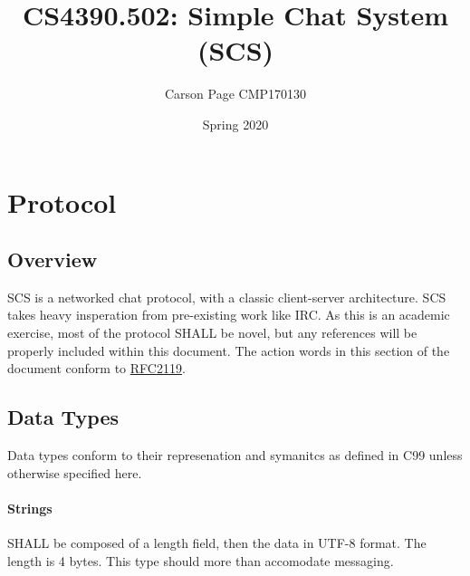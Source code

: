 \documentclass[12pt]{article}
\title{CS4390.502: Simple Chat System (SCS)}
\author{Carson Page CMP170130}
\date{Spring 2020}
\begin{document}
\begin{titlepage}
    \maketitle
\end{titlepage}
\tableofcontents
\cleardoublepage
\newpage

\setlength{\parskip}{0.5em}

\section{Protocol}
\subsection{Overview}
SCS is a networked chat protocol, with a classic client-server architecture. SCS
takes heavy insperation from pre-existing work like IRC. As this is an academic
exercise, most of the protocol SHALL be novel, but any references will be
properly included within this document.
The action words in this section of the document conform to
\href{https://tools.ietf.org/html/rfc2119}{RFC2119}.
\subsection{Data Types}
Data types conform to their represenation and symanitcs as defined in C99 unless
otherwise specified here.
\paragraph[]{Strings} SHALL be composed of a length field, then the data in UTF-8 format. The
length is 4 bytes. This type should more than accomodate messaging.
\end{document}
